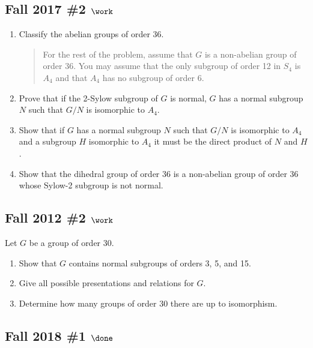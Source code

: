 \hypertarget{fall-2017-2-work}{%
\subsection{\texorpdfstring{Fall 2017 \#2
\(\work\)}{Fall 2017 \#2 \textbackslash work}}\label{fall-2017-2-work}}

\begin{enumerate}
\def\labelenumi{\alph{enumi}.}
\item
  Classify the abelian groups of order 36.

  \begin{quote}
  For the rest of the problem, assume that \(G\) is a non-abelian group
  of order 36. You may assume that the only subgroup of order 12 in
  \(S_4\) is \(A_4\) and that \(A_4\) has no subgroup of order 6.
  \end{quote}
\item
  Prove that if the 2-Sylow subgroup of \(G\) is normal, \(G\) has a
  normal subgroup \(N\) such that \(G/N\) is isomorphic to \(A_4\).
\item
  Show that if \(G\) has a normal subgroup \(N\) such that \(G/N\) is
  isomorphic to \(A_4\) and a subgroup \(H\) isomorphic to \(A_4\) it
  must be the direct product of \(N\) and \(H\).
\item
  Show that the dihedral group of order 36 is a non-abelian group of
  order 36 whose Sylow-2 subgroup is not normal.
\end{enumerate}

\hypertarget{fall-2012-2-work}{%
\subsection{\texorpdfstring{Fall 2012 \#2
\(\work\)}{Fall 2012 \#2 \textbackslash work}}\label{fall-2012-2-work}}

Let \(G\) be a group of order 30.

\begin{enumerate}
\def\labelenumi{\alph{enumi}.}
\item
  Show that \(G\) contains normal subgroups of orders 3, 5, and 15.
\item
  Give all possible presentations and relations for \(G\).
\item
  Determine how many groups of order 30 there are up to isomorphism.
\end{enumerate}

\hypertarget{fall-2018-1-done}{%
\subsection{\texorpdfstring{Fall 2018 \#1
\(\done\)}{Fall 2018 \#1 \textbackslash done}}\label{fall-2018-1-done}}

